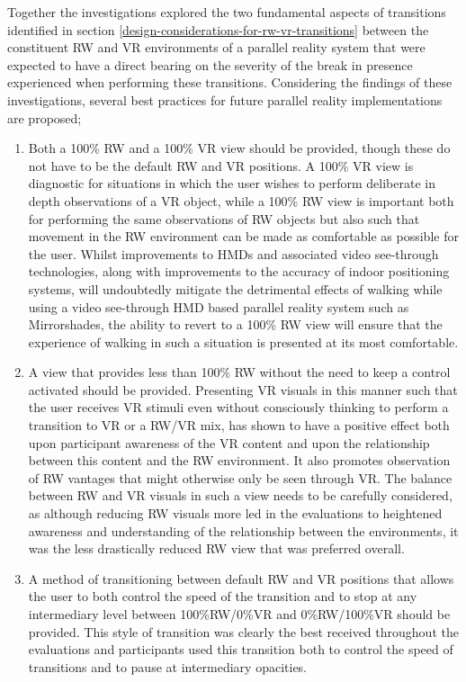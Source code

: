 Together the investigations explored the two fundamental aspects of transitions identified in section \ref{design-considerations-for-rw-vr-transitions} between the constituent RW and VR environments of a parallel reality system that were expected to have a direct bearing on the severity of the break in presence experienced when performing these transitions. Considering the findings of these investigations, several best practices for future parallel reality implementations are proposed;

\begin{enumerate}
	\item Both a 100\% RW and a 100\% VR view should be provided, though these do not have to be the default RW and VR positions. A 100\% VR view is diagnostic for situations in which the user wishes to perform deliberate in depth observations of a VR object, while a 100\% RW view is important both for performing the same observations of RW objects but also such that movement in the RW environment can be made as comfortable as possible for the user. Whilst improvements to HMDs and associated video see-through technologies, along with improvements to the accuracy of indoor positioning systems, will undoubtedly mitigate the detrimental effects of walking while using a video see-through HMD based parallel reality system such as Mirrorshades, the ability to revert to a 100\% RW view will ensure that the experience of walking in such a situation is presented at its most comfortable.
	\item A view that provides less than 100\% RW without the need to keep a control activated should be provided. Presenting VR visuals in this manner such that the user receives VR stimuli even without consciously thinking to perform a transition to VR or a RW/VR mix, has shown to have a positive effect both upon participant awareness of the VR content and upon the relationship between this content and the RW environment. It also promotes observation of RW vantages that might otherwise only be seen through VR. The balance between RW and VR visuals in such a view needs to be carefully considered, as although reducing RW visuals more led in the evaluations to heightened awareness and understanding of the relationship between the environments, it was the less drastically reduced RW view that was preferred overall.
	\item A method of transitioning between default RW and VR positions that allows the user to both control the speed of the transition and to stop at any intermediary level between 100\%RW/0\%VR and 0\%RW/100\%VR should be provided. This style of transition was clearly the best received throughout the evaluations and participants used this transition both to control the speed of transitions and to pause at intermediary opacities.
\end{enumerate}

